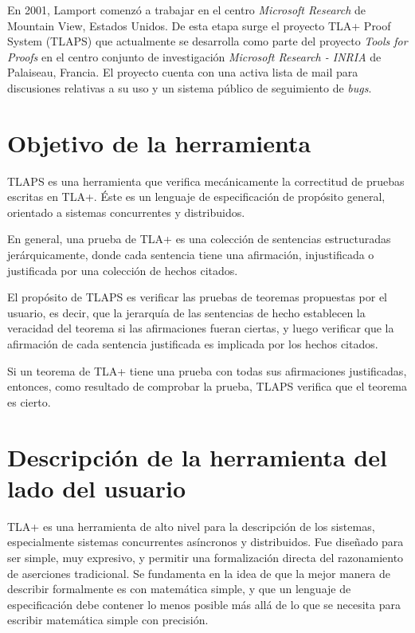 \documentclass[spanish]{llncs}
\begin{document}
En 2001, Lamport comenzó a trabajar en el centro \textit{Microsoft Research} de Mountain View, Estados Unidos. De esta etapa surge el proyecto TLA+ Proof System (TLAPS) que actualmente se desarrolla como parte del proyecto \textit{Tools for Proofs} en el centro conjunto de investigación \textit{Microsoft Research - INRIA} de Palaiseau, Francia. El proyecto cuenta con una activa lista de mail para discusiones relativas a su uso y un sistema público de seguimiento de \textit{bugs}.



\section{Objetivo de la herramienta}

TLAPS es una herramienta que verifica mecánicamente la correctitud de pruebas escritas en TLA+.
Éste es un lenguaje de especificación de propósito general, orientado a sistemas concurrentes y distribuidos.

En general, una prueba de TLA+ es una colección de sentencias estructuradas jerárquicamente,
donde cada sentencia tiene una afirmación, injustificada o justificada por una colección de hechos citados.

El propósito de TLAPS es verificar las pruebas de teoremas propuestas por el usuario, es decir,
que la jerarquía de las sentencias de hecho establecen la veracidad del teorema si las afirmaciones fueran ciertas,
y luego verificar que la afirmación de cada sentencia justificada es implicada por los hechos citados.

Si un teorema de TLA+ tiene una prueba con todas sus afirmaciones justificadas, entonces, como resultado
de comprobar la prueba, TLAPS verifica que el teorema es cierto.

\section{Descripción de la herramienta del lado del usuario}

TLA+ es una herramienta de alto nivel para la descripción de los sistemas, especialmente sistemas concurrentes asíncronos y distribuidos. 
Fue diseñado para ser simple, muy expresivo, y permitir una formalización directa del razonamiento de aserciones tradicional.
Se fundamenta en la idea de que la mejor manera de describir formalmente es con matemática simple, y que un lenguaje de especificación debe contener lo menos posible más allá de lo que se necesita para escribir matemática simple con precisión.
\end{document}
